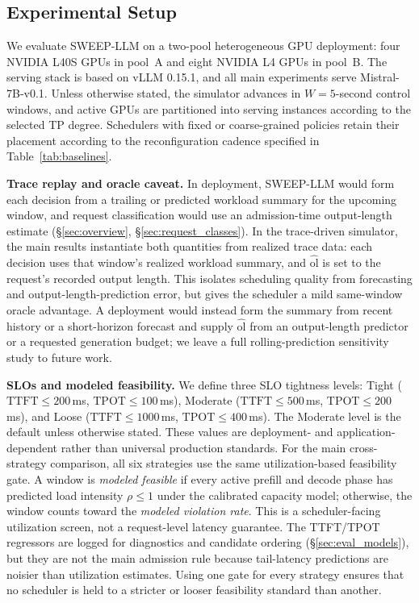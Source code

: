 \subsection{Experimental Setup}
\label{sec:eval_setup}

We evaluate SWEEP-LLM on a two-pool heterogeneous GPU deployment: four NVIDIA L40S GPUs in pool~A and eight NVIDIA L4 GPUs in pool~B.
The serving stack is based on vLLM 0.15.1, and all main experiments serve Mistral-7B-v0.1.
Unless otherwise stated, the simulator advances in $W{=}5$-second control windows, and active GPUs are partitioned into serving instances according to the selected TP degree.
Schedulers with fixed or coarse-grained policies retain their placement according to the reconfiguration cadence specified in Table~\ref{tab:baselines}.

\textbf{Trace replay and oracle caveat.}
In deployment, SWEEP-LLM would form each decision from a trailing or predicted workload summary for the upcoming window, and request classification would use an admission-time output-length estimate (\S\ref{sec:overview}, \S\ref{sec:request_classes}).
In the trace-driven simulator, the main results instantiate both quantities from realized trace data: each decision uses that window's realized workload summary, and $\widehat{\mathrm{ol}}$ is set to the request's recorded output length.
This isolates scheduling quality from forecasting and output-length-prediction error, but gives the scheduler a mild same-window oracle advantage.
A deployment would instead form the summary from recent history or a short-horizon forecast and supply $\widehat{\mathrm{ol}}$ from an output-length predictor or a requested generation budget; we leave a full rolling-prediction sensitivity study to future work.

\textbf{SLOs and modeled feasibility.}
We define three SLO tightness levels: Tight ($\mathrm{TTFT}\leq 200$\,ms, $\mathrm{TPOT}\leq 100$\,ms), Moderate ($\mathrm{TTFT}\leq 500$\,ms, $\mathrm{TPOT}\leq 200$\,ms), and Loose ($\mathrm{TTFT}\leq 1000$\,ms, $\mathrm{TPOT}\leq 400$\,ms).
The Moderate level is the default unless otherwise stated.
These values are deployment- and application-dependent rather than universal production standards.
For the main cross-strategy comparison, all six strategies use the same utilization-based feasibility gate.
A window is \emph{modeled feasible} if every active prefill and decode phase has predicted load intensity $\rho\leq 1$ under the calibrated capacity model; otherwise, the window counts toward the \emph{modeled violation rate}.
This is a scheduler-facing utilization screen, not a request-level latency guarantee.
The TTFT/TPOT regressors are logged for diagnostics and candidate ordering (\S\ref{sec:eval_models}), but they are not the main admission rule because tail-latency predictions are noisier than utilization estimates.
Using one gate for every strategy ensures that no scheduler is held to a stricter or looser feasibility standard than another.

